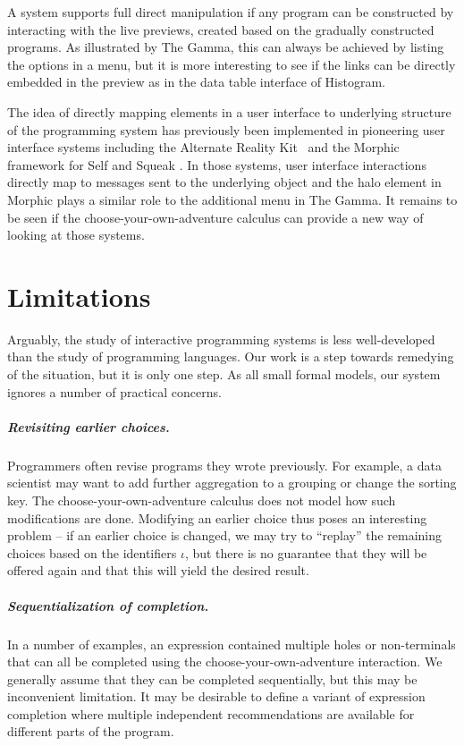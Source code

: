 \documentclass[ a4paper,UKenglish,cleveref, autoref, thm-restate]{lipics-v2021}
\begin{document}
A system supports full direct manipulation if any program can be constructed by interacting with
the live previews, created based on the gradually constructed programs. As illustrated by The Gamma,
this can always be achieved by listing the options in a menu, but it is more interesting to see
if the links can be directly embedded in the preview as in the data table interface of Histogram.

The idea of directly mapping elements in a user interface to underlying structure of the
programming system has previously been implemented in pioneering user interface systems
including the Alternate Reality Kit~\cite{randall-1986-ark} and the Morphic framework for
Self and Squeak \cite{maloney-1995-morphic,maloney-2001-morphic}. In those systems, user interface
interactions directly map to messages sent to the underlying object and the halo element in
Morphic plays a similar role to the additional menu in The Gamma. It remains to be seen if
the choose-your-own-adventure calculus can provide a new way of looking at those systems.

\section{Limitations}
\label{sec:limitations}

Arguably, the study of interactive programming systems is less well-developed than the study
of programming languages. Our work is a step towards remedying of the situation, but it is
only one step. As all small formal models, our system ignores a number of practical concerns.

\subparagraph{Revisiting earlier choices.}
Programmers often revise programs they wrote previously. For example, a data
scientist may want to add further aggregation to a grouping or change the sorting key.
The choose-your-own-adventure calculus does not model how such modifications are done.
Modifying an earlier choice thus poses an interesting problem -- if an earlier choice is
changed, we may try to ``replay'' the remaining choices based on the identifiers $\iota$,
but there is no guarantee that they will be offered again and that this will yield the
desired result.

\subparagraph{Sequentialization of completion.}
In a number of examples, an expression contained multiple holes or non-terminals that can
all be completed using the choose-your-own-adventure interaction. We generally assume that they
can be completed sequentially, but this may be inconvenient limitation. It may be desirable to
define a variant of expression completion where multiple independent recommendations are
available for different parts of the program.
\end{document}
